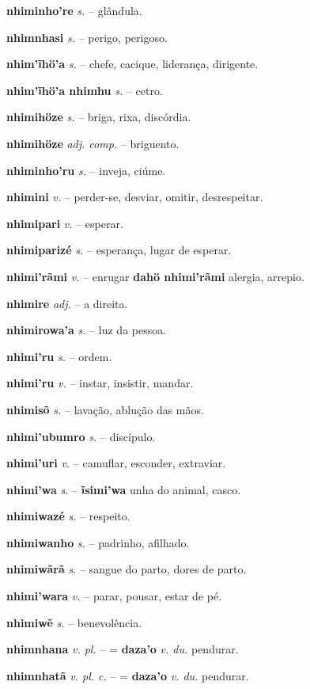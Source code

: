 \textbf{nhiminho're} \textit{s.} -- glândula.

\textbf{nhimnhasi} \textit{s.} -- perigo, perigoso.

\textbf{nhim'ĩhö'a} \textit{s.} -- chefe, cacique, liderança, dirigente.

\textbf{nhim'ĩhö'a nhimhu} \textit{s.} -- cetro.

\textbf{nhimihöze} \textit{s.} -- briga, rixa, discórdia.

\textbf{nhimihöze} \textit{adj. comp.} -- briguento.

\textbf{nhiminho'ru} \textit{s.} -- inveja, ciúme.

\textbf{nhimini} \textit{v.} -- perder-se, desviar, omitir, desrespeitar.

\textbf{nhimipari} \textit{v.} -- esperar.

\textbf{nhimiparizé} \textit{s.} -- esperança, lugar de esperar.

\textbf{nhimi'rãmi} \textit{v.} -- enrugar  \textbf{dahö nhimi'rãmi} alergia, arrepio.

\textbf{nhimire} \textit{adj.} -- a direita.

\textbf{nhimirowa'a} \textit{s.} -- luz da pessoa.

\textbf{nhimi'ru} \textit{s.} -- ordem.

\textbf{nhimi'ru} \textit{v.} -- instar, insistir, mandar.

\textbf{nhimisõ} \textit{s.} -- lavação, ablução das mãos.

\textbf{nhimi'ubumro} \textit{s.} -- discípulo.

\textbf{nhimi'uri} \textit{v.} -- camuflar, esconder, extraviar.

\textbf{nhimi'wa} \textit{s.} -- \textbf{ĩsimi'wa} unha do animal, casco.

\textbf{nhimiwazé} \textit{s.} -- respeito.

\textbf{nhimiwanho} \textit{s.} -- padrinho, afilhado.

\textbf{nhimiwãrã} \textit{s.} -- sangue do parto, dores de parto.

\textbf{nhimi'wara} \textit{v.} -- parar, pousar, estar de pé.

\textbf{nhimiwẽ} \textit{s.} -- benevolência.

\textbf{nhimnhana} \textit{v. pl.} -- = \textbf{daza'o} \textit{v. du.} pendurar.

\textbf{nhimnhatã} \textit{v. pl. c.} -- = \textbf{daza'o} \textit{v. du.} pendurar.

